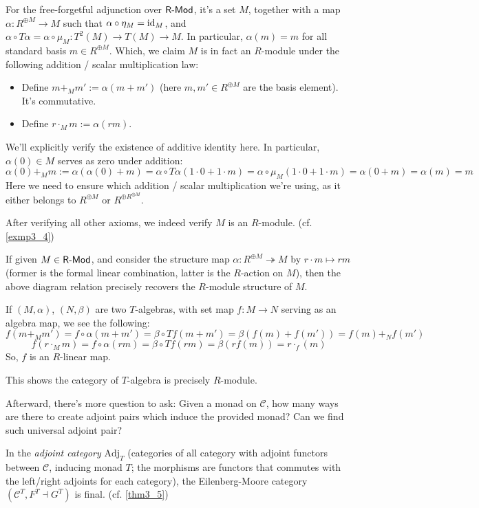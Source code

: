 \documentclass{article}
\begin{document}
\begin{exmp}
    For the free-forgetful adjunction over $\mathsf{R}\text{-}\mathsf{Mod}$, it's a set $M$, together with a map $\alpha:R^{\oplus M}\rightarrow M$ such that $\alpha\circ \eta_M = \mathrm{id}_M$, and $\alpha\circ T\alpha = \alpha\circ \mu_M:T^2(M)\rightarrow T(M)\rightarrow M$. In particular, $\alpha(m)=m$ for all standard basis $m\in R^{\oplus M}$. Which, we claim $M$ is in fact an $R$-module under the following addition / scalar multiplication law:

    \begin{itemize}
        \item Define $m+_M m':= \alpha(m+m')$ (here $m,m'\in R^{\oplus M}$ are the basis element). It's commutative.
        \item Define $r\cdot_M m := \alpha(r m)$.
    \end{itemize}

    We'll explicitly verify the existence of additive identity here. In particular, $\alpha(0)\in M$ serves as zero under addition: 
        \[\alpha(0)+_M m := \alpha(\alpha(0)+m) = \alpha\circ T\alpha(1\cdot 0+1\cdot m) = \alpha\circ \mu_M(1\cdot 0+1\cdot m) = \alpha(0+m) = \alpha(m)=m\]
    Here we need to ensure which addition / scalar multiplication we're using, as it either belongs to $R^{\oplus M}$ or $R^{\oplus R^{\oplus M}}$.
    
    After verifying all other axioms, we indeed verify $M$ is an $R$-module. (cf. \ref{exmp3_4})

    \hfil

    If given $M\in\mathsf{R}\text{-}\mathsf{Mod}$, and consider the structure map $\alpha:R^{\oplus M}\twoheadrightarrow M$ by $r\cdot m\mapsto rm$ (former is the formal linear combination, latter is the $R$-action on $M$), then the above diagram relation precisely recovers the $R$-module structure of $M$.

    \hfil

    If $(M,\alpha)$, $(N,\beta)$ are two $T$-algebras, with set map $f:M\rightarrow N$ serving as an algebra map, we see the following:
    \[f(m+_M m') = f\circ \alpha(m+m') = \beta\circ Tf(m+m') = \beta(f(m)+f(m')) = f(m)+_N f(m')\]
    \[f(r\cdot_M m) = f\circ \alpha(r m)=\beta\circ Tf(rm) = \beta(r f(m)) = r\cdot_ f(m)\]
    So, $f$ is an $R$-linear map.
    
    This shows the category of $T$-algebra is precisely $R$-module.
\end{exmp}

\hfil

Afterward, there's more question to ask: Given a monad on $\mathcal{C}$, how many ways are there to create adjoint pairs which induce the provided monad? Can we find such universal adjoint pair? 
\begin{thm}
    In the \emph{adjoint category} $\text{Adj}_T$ (categories of all category with adjoint functors between $\mathcal{C}$, inducing monad $T$; the morphisms are functors that commutes with the left/right adjoints for each category), the Eilenberg-Moore category $(\mathcal{C}^T,F^T\dashv G^T)$ is final. (cf. \ref{thm3_5})
\end{thm}
\end{document}
